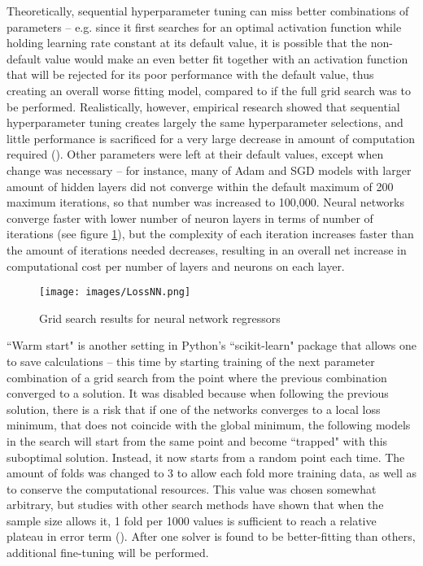 \documentclass[12pt]{report}
\begin{document}
Theoretically, sequential hyperparameter tuning can miss better combinations of parameters -- e.g. since it first searches for an optimal activation function while holding learning rate constant at its default value, it is possible that the non-default value would make an even better fit together with an activation function that will be rejected for its poor performance with the default value, thus creating an overall worse fitting model, compared to if the full grid search was to be performed. Realistically, however, empirical research showed that sequential hyperparameter tuning creates largely the same hyperparameter selections, and little performance is sacrificed for a very large decrease in amount of computation required (\cite{jin2022}). Other parameters were left at their default values, except when change was necessary -- for instance, many of Adam and SGD models with larger amount of hidden layers did not converge within the default maximum of 200 maximum iterations, so that number was increased to 100,000. Neural networks converge faster with lower number of neuron layers in terms of number of iterations (see figure \ref{fig:nnloss}), but the complexity of each iteration increases faster than the amount of iterations needed decreases, resulting in an overall net increase in computational cost per number of layers and neurons on each layer.

\begin{figure}[ht]
	\centering
	\texttt{[image: images/LossNN.png]}
	\caption{Grid search results for neural network regressors}
	\label{fig:nnloss}
\end{figure}

``Warm start" is another setting in Python's ``scikit-learn" package that allows one to save calculations -- this time by starting training of the next parameter combination of a grid search from the point where the previous combination converged to a solution. It was disabled because when following the previous solution, there is a risk that if one of the networks converges to a local loss minimum, that does not coincide with the global minimum, the following models in the search will start from the same point and become ``trapped" with this suboptimal solution. Instead, it now starts from a random point each time. The amount of folds was changed to 3 to allow each fold more training data, as well as to conserve the computational resources. This value was chosen somewhat arbitrary, but studies with other search methods have shown that when the sample size allows it, 1 fold per 1000 values is sufficient to reach a relative plateau in error term (\cite{marcot2021}). After one solver is found to be better-fitting than others, additional fine-tuning will be performed.
\end{document}
